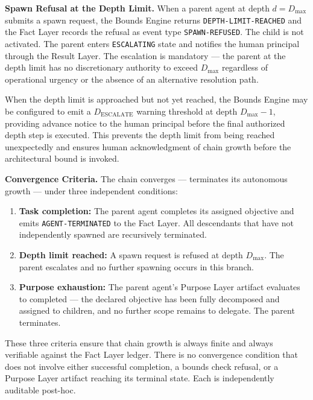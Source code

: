 \documentclass[12pt]{article}
\begin{document}
\bigskip
\noindent\textbf{Spawn Refusal at the Depth Limit.} When a parent agent at depth $d = D_{\max}$ submits a spawn request, the Bounds Engine returns \texttt{DEPTH-LIMIT-REACHED} and the Fact Layer records the refusal as event type \texttt{SPAWN-REFUSED}. The child is not activated. The parent enters \texttt{ESCALATING} state and notifies the human principal through the Result Layer. The escalation is mandatory — the parent at the depth limit has no discretionary authority to exceed $D_{\max}$ regardless of operational urgency or the absence of an alternative resolution path.

When the depth limit is approached but not yet reached, the Bounds Engine may be configured to emit a $D_{\text{ESCALATE}}$ warning threshold at depth $D_{\max} - 1$, providing advance notice to the human principal before the final authorized depth step is executed. This prevents the depth limit from being reached unexpectedly and ensures human acknowledgment of chain growth before the architectural bound is invoked.

\bigskip
\noindent\textbf{Convergence Criteria.} The chain converges — terminates its autonomous growth — under three independent conditions:

\begin{enumerate}
  \item[(CC-1)] \textbf{Task completion:} The parent agent completes its assigned objective and emits \texttt{AGENT-TERMINATED} to the Fact Layer. All descendants that have not independently spawned are recursively terminated.

  \item[(CC-2)] \textbf{Depth limit reached:} A spawn request is refused at depth $D_{\max}$. The parent escalates and no further spawning occurs in this branch.

  \item[(CC-3)] \textbf{Purpose exhaustion:} The parent agent's Purpose Layer artifact evaluates to completed — the declared objective has been fully decomposed and assigned to children, and no further scope remains to delegate. The parent terminates.
\end{enumerate}

These three criteria ensure that chain growth is always finite and always verifiable against the Fact Layer ledger. There is no convergence condition that does not involve either successful completion, a bounds check refusal, or a Purpose Layer artifact reaching its terminal state. Each is independently auditable post-hoc.
\end{document}
